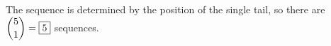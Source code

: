 The sequence is determined by the position of the single tail, so there are $\dbinom51=\boxed{5}$ sequences.
